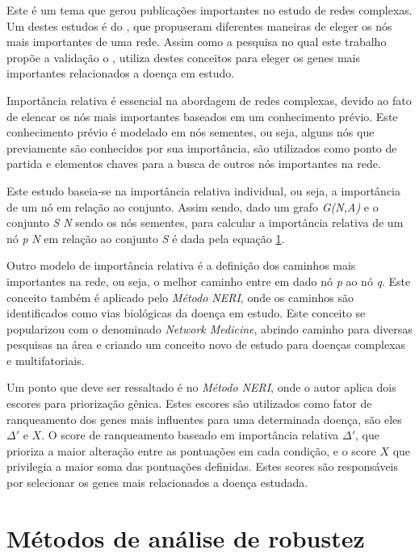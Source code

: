 Este é um tema que gerou publicações importantes no estudo de redes complexas. Um destes estudos é do \cite{White2003}, que propuseram diferentes maneiras de eleger os nós mais importantes de uma rede. Assim como a pesquisa no qual este trabalho propõe a validação o \cite{NERI}, utiliza destes conceitos para eleger os genes mais importantes relacionados a doença em estudo.
%

Importância relativa é essencial na abordagem de redes complexas, devido ao fato de elencar os nós mais importantes baseados em um conhecimento prévio. Este conhecimento prévio é modelado em nós sementes, ou seja, alguns nós que previamente são conhecidos por sua importância, são utilizados como ponto de partida e elementos chaves para a busca de outros nós importantes na rede.
%

Este estudo baseia-se na importância relativa individual, ou seja, a importância de um nó em relação ao conjunto. Assim sendo, dado um grafo \textsl{G(N,A)} e o conjunto \textsl{S} \in \textsl{N} sendo os nós sementes, para calcular a importância relativa de um nó \textsl{p} \in \textsl{N} em relação ao conjunto \textsl{S} é dada pela equação \ref{}.
%
%

Outro modelo de importância relativa é a definição dos caminhos mais importantes na rede, ou seja, o melhor caminho entre em dado nó \textsl{p} ao nó \textsl{q}. Este conceito também é aplicado pelo \textsl{Método NERI}, onde os caminhos são identificados como vias biológicas da doença em estudo. Este conceito se popularizou com o \cite{Barabasi2011} denominado \textsl{Network Medicine}, abrindo caminho para diversas pesquisas na área e criando um conceito novo de estudo para doenças complexas e multifatoriais.
%

Um ponto que deve ser ressaltado é no \textsl{Método NERI}, onde o autor aplica dois escores para priorização gênica. Estes escores são utilizados como fator de ranqueamento dos genes mais influentes para uma determinada doença, são eles $\Delta'$ e $X$. O score de ranqueamento baseado em importância relativa $\Delta'$, que prioriza a maior alteração entre as pontuações em cada condição, e o score $X$ que privilegia a maior soma das pontuações definidas. Estes scores são responsáveis por selecionar os genes mais relacionados a doença estudada.


\section{Métodos de análise de robustez}

